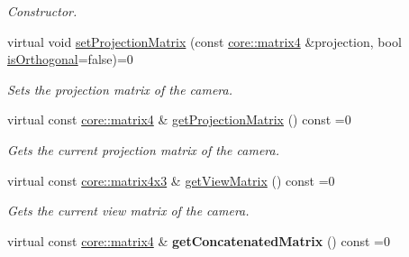 \begin{DoxyCompactItemize}
\begin{DoxyCompactList}\small\item\em Constructor. \end{DoxyCompactList}\item 
virtual void \hyperlink{classirr_1_1scene_1_1ICameraSceneNode_a022415e06070ad77c6053eba64ba62ae}{set\+Projection\+Matrix} (const \hyperlink{namespaceirr_1_1core_a73fa92e638c5ca97efd72da307cc9b65}{core\+::matrix4} \&projection, bool \hyperlink{classirr_1_1scene_1_1ICameraSceneNode_a6d3054077c7514f05101644e143b1ab8}{is\+Orthogonal}=false)=0
\begin{DoxyCompactList}\small\item\em Sets the projection matrix of the camera. \end{DoxyCompactList}\item 
virtual const \hyperlink{namespaceirr_1_1core_a73fa92e638c5ca97efd72da307cc9b65}{core\+::matrix4} \& \hyperlink{classirr_1_1scene_1_1ICameraSceneNode_a819336312e8559c2f2b074ebacd97c08}{get\+Projection\+Matrix} () const  =0
\begin{DoxyCompactList}\small\item\em Gets the current projection matrix of the camera. \end{DoxyCompactList}\item 
virtual const \hyperlink{classirr_1_1core_1_1matrix4x3}{core\+::matrix4x3} \& \hyperlink{classirr_1_1scene_1_1ICameraSceneNode_aecd85028f1ca71be10945154bbba043a}{get\+View\+Matrix} () const  =0
\begin{DoxyCompactList}\small\item\em Gets the current view matrix of the camera. \end{DoxyCompactList}\item 
virtual const \hyperlink{namespaceirr_1_1core_a73fa92e638c5ca97efd72da307cc9b65}{core\+::matrix4} \& {\bfseries get\+Concatenated\+Matrix} () const  =0\hypertarget{classirr_1_1scene_1_1ICameraSceneNode_aec0c8a62f72d57c6d6d75b5468476d73}{}\label{classirr_1_1scene_1_1ICameraSceneNode_aec0c8a62f72d57c6d6d75b5468476d73}


\end{DoxyCompactItemize}
